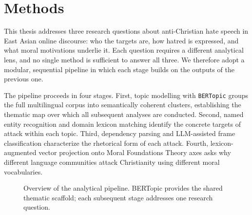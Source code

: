 \documentclass[../CLthesis.tex]{subfiles}
\begin{document}
\chapter{Methods}%
\label{chap:methods}

This thesis addresses three research questions about anti-Christian hate speech in East Asian online discourse: who the targets are, how hatred is expressed, and what moral motivations underlie it. Each question requires a different analytical lens, and no single method is sufficient to answer all three. We therefore adopt a modular, sequential pipeline in which each stage builds on the outputs of the previous one.

The pipeline proceeds in four stages. First, topic modelling with \texttt{BERTopic} groups the full multilingual corpus into semantically coherent clusters, establishing the thematic map over which all subsequent analyses are conducted. Second, named entity recognition and domain lexicon matching identify the concrete targets of attack within each topic. Third, dependency parsing and LLM-assisted frame classification characterize the rhetorical form of each attack. Fourth, lexicon-augmented vector projection onto Moral Foundations Theory axes asks why different language communities attack Christianity using different moral vocabularies.

\begin{figure}[h]
\centering
{}
\caption{Overview of the analytical pipeline. BERTopic provides the shared thematic scaffold; each subsequent stage addresses one research question.}
\label{fig:pipeline-overview}
\end{figure}
\end{document}
